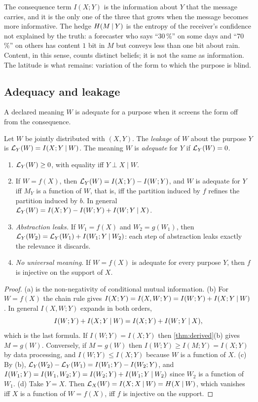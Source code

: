 The consequence term $I(X;Y)$ is the information about $Y$ that the message carries, and it is the only one of the three that grows when the message becomes more informative. The hedge $H(M\mathbin{\vert} Y)$ is the entropy of the receiver's confidence not explained by the truth: a forecaster who says ``30\,\%'' on some days and ``70\,\%'' on others has content $1$ bit in $M$ but conveys less than one bit about rain. Content, in this sense, counts distinct beliefs; it is not the same as information. The latitude is what remains: variation of the form to which the purpose is blind.

\subsection{Adequacy and leakage}
A declared meaning $W$ is adequate for a purpose when it screens the form off from the consequence.
\begin{definition}\label{def:leak}
Let $W$ be jointly distributed with $(X,Y)$. The \emph{leakage} of $W$ about the purpose $Y$ is $\mathcal{L}_Y(W)=I(X;Y\mathbin{\vert} W)$. The meaning $W$ is \emph{adequate} for $Y$ if $\mathcal{L}_Y(W)=0$.
\end{definition}
\begin{theorem}[Leakage]\label{thm:leak}
\begin{enumerate}[label=\textup{(\alph*)}]
\item $\mathcal{L}_Y(W)\ge0$, with equality iff $Y\perp X\mid W$.
\item If $W=f(X)$, then $\mathcal{L}_Y(W)=I(X;Y)-I(W;Y)$, and $W$ is adequate for $Y$ iff $M_Y$ is a function of $W$, that is, iff the partition induced by $f$ refines the partition induced by $b$. In general $\mathcal{L}_Y(W)=I(X;Y)-I(W;Y)+I(W;Y\mathbin{\vert} X)$.
\item \emph{Abstraction leaks.} If $W_1=f(X)$ and $W_2=g(W_1)$, then $\mathcal{L}_Y(W_2)=\mathcal{L}_Y(W_1)+I(W_1;Y\mathbin{\vert} W_2)$: each step of abstraction leaks exactly the relevance it discards.
\item \emph{No universal meaning.} If $W=f(X)$ is adequate for every purpose $Y$, then $f$ is injective on the support of $X$.
\end{enumerate}
\end{theorem}
\begin{proof}
(a) is the non-negativity of conditional mutual information. (b) For $W=f(X)$ the chain rule gives $I(X;Y)=I(X,W;Y)=I(W;Y)+I(X;Y\mathbin{\vert} W)$. In general $I(X,W;Y)$ expands in both orders, \[ I(W;Y)+I(X;Y\mathbin{\vert} W)=I(X;Y)+I(W;Y\mathbin{\vert} X), \] which is the last formula. If $I(W;Y)=I(X;Y)$ then \cref{thm:derived}(b) gives $M=g(W)$. Conversely, if $M=g(W)$ then $I(W;Y)\ge I(M;Y)=I(X;Y)$ by data processing, and $I(W;Y)\le I(X;Y)$ because $W$ is a function of $X$.
(c) By (b), $\mathcal{L}_Y(W_2)-\mathcal{L}_Y(W_1)=I(W_1;Y)-I(W_2;Y)$, and $I(W_1;Y)=I(W_1,W_2;Y)=I(W_2;Y)+I(W_1;Y\mathbin{\vert} W_2)$ since $W_2$ is a function of $W_1$.
(d) Take $Y=X$. Then $\mathcal{L}_X(W)=I(X;X\mathbin{\vert} W)=H(X\mathbin{\vert} W)$, which vanishes iff $X$ is a function of $W=f(X)$, iff $f$ is injective on the support.
\end{proof}
